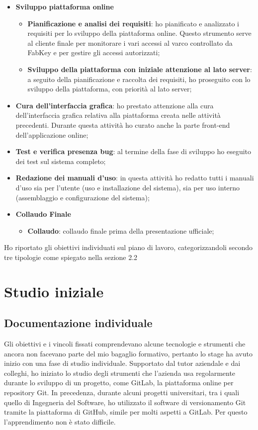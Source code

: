 \begin{itemize}
\item \textbf{Sviluppo piattaforma online}
\begin{itemize}
	\item \textbf{Pianificazione e analisi dei requisiti}: ho pianificato e analizzato i requisiti per lo sviluppo della piattaforma online. Questo strumento serve al cliente finale per monitorare i vari accessi al varco controllato da FabKey e per gestire gli accessi autorizzati;
	\item \textbf{Sviluppo della piattaforma con iniziale attenzione al lato server}: a seguito della pianificazione e raccolta dei requisiti, ho proseguito con lo sviluppo della piattaforma, con priorità al lato server;
\end{itemize}

\item \textbf{Cura dell'interfaccia grafica}: ho prestato attenzione alla cura dell'interfaccia grafica relativa alla piattaforma creata nelle attività precedenti. Durante questa attività ho curato anche la parte front-end dell'applicazione online;
\item \textbf{Test e verifica presenza bug}: al termine della fase di sviluppo ho eseguito dei test sul sistema completo;
\item \textbf{Redazione dei manuali d’uso}: in questa attività ho redatto tutti i manuali d'uso sia per l'utente (uso e installazione del sistema), sia per uso interno (assemblaggio e configurazione del sistema);

\item \textbf{Collaudo Finale}
\begin{itemize}
	\item \textbf{Collaudo}: collaudo finale prima della presentazione ufficiale;
\end{itemize}
\end{itemize}

\medskip

Ho riportato gli obiettivi individuati sul piano di lavoro, categorizzandoli secondo tre tipologie come spiegato nella sezione 2.2


\section{Studio iniziale}
\subsection{Documentazione individuale}
Gli obiettivi e i vincoli fissati comprendevano alcune tecnologie e strumenti che ancora non facevano parte del mio bagaglio formativo, pertanto lo stage ha avuto inizio con una fase di studio individuale.
Supportato dal tutor aziendale e dai colleghi, ho iniziato lo studio degli strumenti che l'azienda usa regolarmente durante lo sviluppo di un progetto, come GitLab, la piattaforma online per repository Git. In precedenza, durante alcuni progetti universitari, tra i quali quello di Ingegneria del Software, ho utilizzato il software di versionamento Git tramite la piattaforma di GitHub, simile per molti aspetti a GitLab. Per questo l'apprendimento non è stato difficile.

